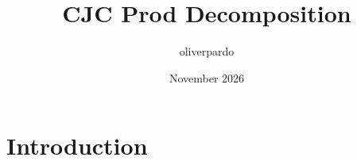 \documentclass{article}
\title{CJC Prod Decomposition}
\author{oliverpardo }
\date{November 2026}
\begin{document}
\maketitle

\section{Introduction}
\end{document}
